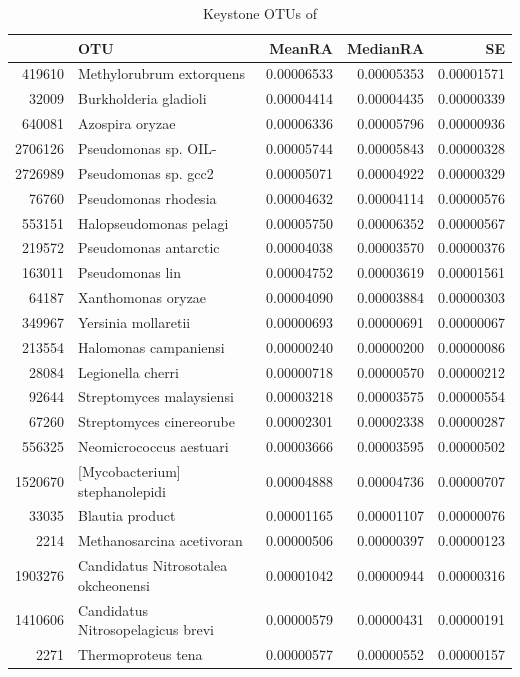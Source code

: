 \begin{table}[ht]
\centering
\begin{tabular}{rlrrr}
  \hline
 & OTU & MeanRA & MedianRA & SE \\ 
  \hline
419610 & Methylorubrum extorquens & 0.00006533 & 0.00005353 & 0.00001571 \\ 
  32009 & Burkholderia gladioli & 0.00004414 & 0.00004435 & 0.00000339 \\ 
  640081 & Azospira oryzae & 0.00006336 & 0.00005796 & 0.00000936 \\ 
  2706126 & Pseudomonas sp. OIL- & 0.00005744 & 0.00005843 & 0.00000328 \\ 
  2726989 & Pseudomonas sp. gcc2 & 0.00005071 & 0.00004922 & 0.00000329 \\ 
  76760 & Pseudomonas rhodesia & 0.00004632 & 0.00004114 & 0.00000576 \\ 
  553151 & Halopseudomonas pelagi & 0.00005750 & 0.00006352 & 0.00000567 \\ 
  219572 & Pseudomonas antarctic & 0.00004038 & 0.00003570 & 0.00000376 \\ 
  163011 & Pseudomonas lin & 0.00004752 & 0.00003619 & 0.00001561 \\ 
  64187 & Xanthomonas oryzae & 0.00004090 & 0.00003884 & 0.00000303 \\ 
  349967 & Yersinia mollaretii & 0.00000693 & 0.00000691 & 0.00000067 \\ 
  213554 & Halomonas campaniensi & 0.00000240 & 0.00000200 & 0.00000086 \\ 
  28084 & Legionella cherri & 0.00000718 & 0.00000570 & 0.00000212 \\ 
  92644 & Streptomyces malaysiensi & 0.00003218 & 0.00003575 & 0.00000554 \\ 
  67260 & Streptomyces cinereorube & 0.00002301 & 0.00002338 & 0.00000287 \\ 
  556325 & Neomicrococcus aestuari & 0.00003666 & 0.00003595 & 0.00000502 \\ 
  1520670 & [Mycobacterium] stephanolepidi & 0.00004888 & 0.00004736 & 0.00000707 \\ 
  33035 & Blautia product & 0.00001165 & 0.00001107 & 0.00000076 \\ 
  2214 & Methanosarcina acetivoran & 0.00000506 & 0.00000397 & 0.00000123 \\ 
  1903276 & Candidatus Nitrosotalea okcheonensi & 0.00001042 & 0.00000944 & 0.00000316 \\ 
  1410606 & Candidatus Nitrosopelagicus brevi & 0.00000579 & 0.00000431 & 0.00000191 \\ 
  2271 & Thermoproteus tena & 0.00000577 & 0.00000552 & 0.00000157 \\ 
   \hline
\end{tabular}
\caption{Keystone OTUs of } 
\end{table}
